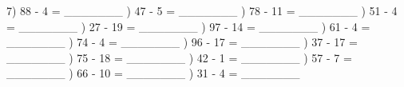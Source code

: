 \documentclass{article}%
\begin{document}
7) 88 {-} 4 = \_\_\_\_\_\_\_%
\newline%
\newline%
) 47 {-} 5 = \_\_\_\_\_\_\_%
\newline%
\newline%
) 78 {-} 11 = \_\_\_\_\_\_\_%
\newline%
\newline%
) 51 {-} 4 = \_\_\_\_\_\_\_%
\newline%
\newline%
) 27 {-} 19 = \_\_\_\_\_\_\_%
\newline%
\newline%
) 97 {-} 14 = \_\_\_\_\_\_\_%
\newline%
\newline%
) 61 {-} 4 = \_\_\_\_\_\_\_%
\newline%
\newline%
) 74 {-} 4 = \_\_\_\_\_\_\_%
\newline%
\newline%
) 96 {-} 17 = \_\_\_\_\_\_\_%
\newline%
\newline%
) 37 {-} 17 = \_\_\_\_\_\_\_%
\newline%
\newline%
) 75 {-} 18 = \_\_\_\_\_\_\_%
\newline%
\newline%
) 42 {-} 1 = \_\_\_\_\_\_\_%
\newline%
\newline%
) 57 {-} 7 = \_\_\_\_\_\_\_%
\newline%
\newline%
) 66 {-} 10 = \_\_\_\_\_\_\_%
\newline%
\newline%
) 31 {-} 4 = \_\_\_\_\_\_\_%
\newline%
\end{document}
